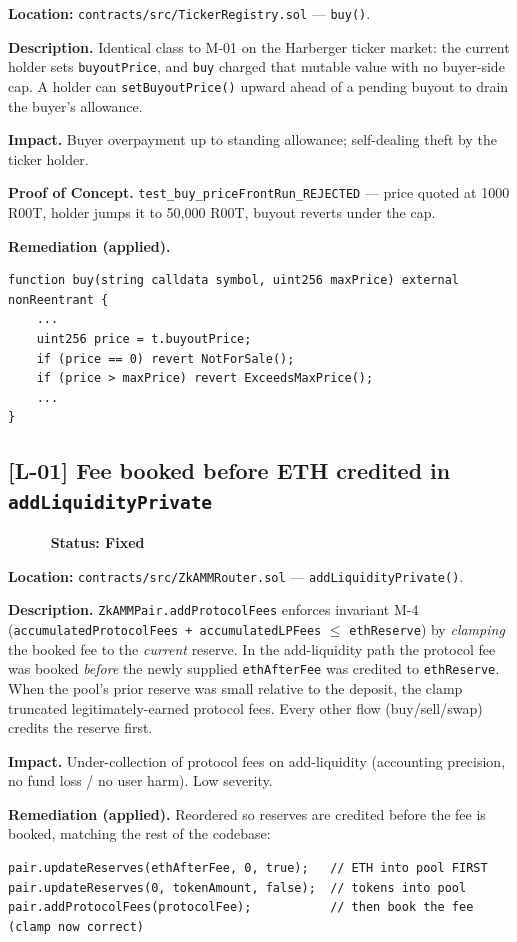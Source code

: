 \documentclass[11pt,a4paper]{article}
\newcommand{\sev}[2]{\textcolor{#1}{\textbf{#2}}}
\newcommand{\badge}[2]{\colorbox{#1}{\textcolor{white}{\bfseries\,#2\,}}}
\begin{document}
\textbf{Location:} \texttt{contracts/src/TickerRegistry.sol} — \texttt{buy()}.

\textbf{Description.} Identical class to M-01 on the Harberger ticker market: the
current holder sets \texttt{buyoutPrice}, and \texttt{buy} charged that mutable
value with no buyer-side cap. A holder can \texttt{setBuyoutPrice()} upward ahead
of a pending buyout to drain the buyer's allowance.

\textbf{Impact.} Buyer overpayment up to standing allowance; self-dealing theft by
the ticker holder.

\textbf{Proof of Concept.} \texttt{test\_buy\_priceFrontRun\_REJECTED} — price
quoted at 1000 R00T, holder jumps it to 50{,}000 R00T, buyout reverts under the cap.

\textbf{Remediation (applied).}
\begin{lstlisting}
function buy(string calldata symbol, uint256 maxPrice) external nonReentrant {
    ...
    uint256 price = t.buyoutPrice;
    if (price == 0) revert NotForSale();
    if (price > maxPrice) revert ExceedsMaxPrice();
    ...
}
\end{lstlisting}

\subsection{[L-01] Fee booked before ETH credited in \texttt{addLiquidityPrivate}}
\noindent\badge{sevlow}{LOW}\quad\textbf{Status: \sev{r00tgreen}{Fixed}}

\textbf{Location:} \texttt{contracts/src/ZkAMMRouter.sol} — \texttt{addLiquidityPrivate()}.

\textbf{Description.} \texttt{ZkAMMPair.addProtocolFees} enforces invariant M-4
(\texttt{accumulatedProtocolFees + accumulatedLPFees} $\leq$ \texttt{ethReserve})
by \emph{clamping} the booked fee to the \emph{current} reserve. In the add-liquidity
path the protocol fee was booked \emph{before} the newly supplied \texttt{ethAfterFee}
was credited to \texttt{ethReserve}. When the pool's prior reserve was small relative
to the deposit, the clamp truncated legitimately-earned protocol fees. Every other
flow (buy/sell/swap) credits the reserve first.

\textbf{Impact.} Under-collection of protocol fees on add-liquidity (accounting
precision, no fund loss / no user harm). Low severity.

\textbf{Remediation (applied).} Reordered so reserves are credited before the fee is
booked, matching the rest of the codebase:
\begin{lstlisting}
pair.updateReserves(ethAfterFee, 0, true);   // ETH into pool FIRST
pair.updateReserves(0, tokenAmount, false);  // tokens into pool
pair.addProtocolFees(protocolFee);           // then book the fee (clamp now correct)
\end{lstlisting}
\end{document}
